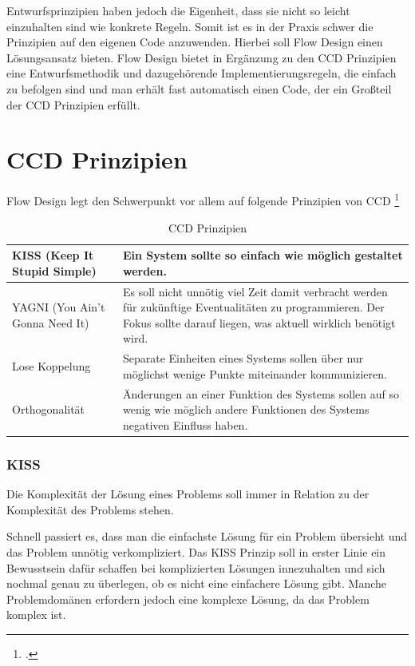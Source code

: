 Entwurfsprinzipien haben jedoch die Eigenheit, dass sie nicht so leicht einzuhalten sind wie konkrete Regeln.
Somit ist es in der Praxis schwer die Prinzipien auf den eigenen Code anzuwenden.
Hierbei soll Flow Design einen Lösungsansatz bieten. Flow Design bietet in
Ergänzung zu den CCD Prinzipien eine Entwurfsmethodik und dazugehörende Implementierungsregeln, die
einfach zu befolgen sind und man erhält fast automatisch einen Code, der ein Großteil der CCD Prinzipien erfüllt.

\section{CCD Prinzipien}

Flow Design legt den Schwerpunkt vor allem auf folgende Prinzipien von CCD \footcite{ROTERGRAD}

\bigskip



\begin{table}[H]
	\centering
	\begin{tabular}{ | p{5cm} | p{9.5cm} | } 
	\hline
	KISS \linebreak (Keep It Stupid Simple)  & Ein System sollte so einfach wie möglich gestaltet werden. \\
	\hline
	YAGNI  \linebreak (You Ain't Gonna Need It) & Es soll nicht unnötig viel Zeit damit verbracht werden für zukünftige Eventualitäten zu programmieren. 
	Der Fokus sollte darauf liegen, was aktuell wirklich benötigt wird. \\
	\hline
	Lose Koppelung & Separate Einheiten eines Systems sollen über nur möglichst  wenige Punkte miteinander kommunizieren. \\
	\hline
	Orthogonalität & Änderungen an einer Funktion des Systems sollen auf so wenig wie möglich andere Funktionen des Systems negativen Einfluss haben. \\
	\hline
	\end{tabular}
	\medskip
	\caption{CCD Prinzipien}
\end{table}

\subsubsection{KISS}

Die Komplexität der Lösung eines Problems soll immer in Relation zu der
Komplexität des Problems stehen.

Schnell passiert es, dass man die einfachste Lösung für ein Problem übersieht und das Problem unnötig verkompliziert.
Das KISS Prinzip soll  in erster Linie ein Bewusstsein dafür schaffen bei
komplizierten Lösungen innezuhalten und sich nochmal genau zu
überlegen, ob es nicht eine einfachere Lösung gibt.
Manche Problemdomänen erfordern jedoch eine komplexe Lösung, da das Problem
komplex ist.

